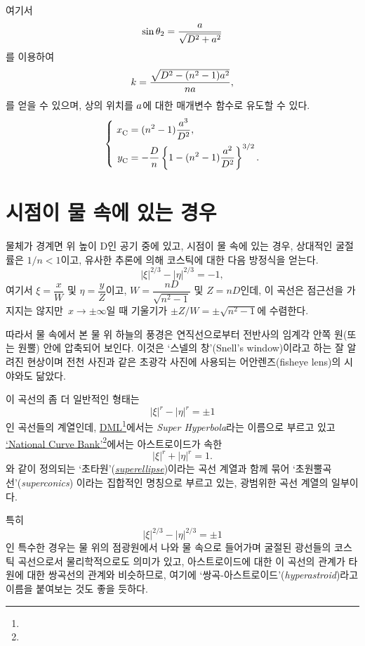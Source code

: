 \documentclass[twocolumn]{article}
\begin{document}
여기서
	$$\sin\theta_2 = \dfrac{{a}}{\sqrt{D^2+{a}^2}}$$
를 이용하여
$$k = \dfrac{\sqrt{D^2-(n^2-1){a}^2}}{n{a}},$$
를 얻을 수 있으며, 
상의 위치를 ${a}$에 대한 매개변수 함수로 유도할 수 있다.
$$ \left\{ 
\begin{aligned}
	x_{\mathrm{C}}^{} &= (n^2-1)\dfrac{\romana^3}{D^2},\\
	y_{\mathrm{C}}^{} &= -\dfrac{D}{n}\left\{ 1-(n^2-1)\dfrac{\romana^2}{D^2} \right\}^{3/2}.
\end{aligned}
\right.$$
	
\section{시점이 물 속에 있는 경우}

물체가 경계면 위 높이 D인 공기 중에 있고, 
시점이 물 속에 있는 경우, 상대적인 굴절률은 $1/n < 1$이고, 
유사한 추론에 의해 코스틱에 대한 다음 방정식을 얻는다.
$$ \left| \xi \right|^{2/3} - \left| \eta \right|^{2/3} = -1, $$
여기서 $\xi = \dfrac{x}{W} $ 및 $\eta = \dfrac{y}{Z}$이고, 
$W = \dfrac{nD}{\sqrt{n^2-1}}$ 및 $Z = nD$인데,  이 곡선은 점근선을 가지지는 않지만 $x\rightarrow\pm\infty$일 때 기울기가 $\pm Z/W = \pm \sqrt{n^2-1}$에 수렴한다.

따라서 물 속에서 본 물 위 하늘의 풍경은
연직선으로부터 전반사의 임계각 안쪽 원(또는 원뿔) 안에 압축되어 보인다. 이것은 
`스넬의 창'(Snell's window)이라고 하는 잘 알려진 현상이며 전천 사진과 같은 초광각 
사진에 사용되는 어안렌즈(fisheye lens)의 시야와도 닮았다.

이 곡선의 좀 더 일반적인 형태는 
$$ \left| \xi \right|^{r} - \left| \eta \right|^{r} = \pm1 $$
인 곡선들의 계열인데, \href{http://dynamicmathematicslearning.com/super-ellipse.html}%
{DML}\footnote{}에서는 \emph{Super Hyperbola}라는 이름으로 부르고 있고 
\href{https://old.nationalcurvebank.org/superconicncb/superconicncb.htm}{`National Curve Bank'}\footnote{}에서는
아스트로이드가 속한 
$$ \left| \xi \right|^{r} + \left| \eta \right|^{r} = 1. $$
와 같이 정의되는 `초타원'(\href{https://mathworld.wolfram.com/Astroid.html}%
{\emph{superellipse}})이라는 곡선 계열과 함께 묶어
`초원뿔곡선'(\emph{superconics}) 이라는 집합적인 명칭으로 부르고 있는, 광범위한 곡선 계열의 일부이다.

특히
$$ \left| \xi \right|^{2/3} - \left| \eta \right|^{2/3} = \pm1 $$
인 특수한 경우는 물 위의 점광원에서 나와 물 속으로 들어가며 굴절된 광선들의 코스틱 곡선으로서 
물리학적으로도 의미가 있고, 아스트로이드에 대한 이 곡선의 관계가 타원에 대한 쌍곡선의 관계와 
비슷하므로, 여기에 `쌍곡-아스트로이드'(\emph{hyperastroid})라고 이름을 붙여보는 것도 좋을 듯하다. 
\end{document}
